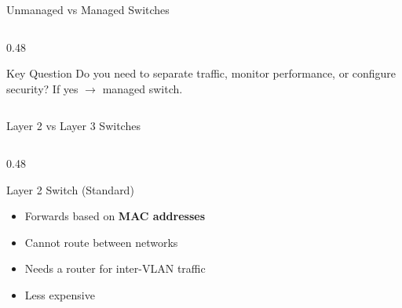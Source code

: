 \documentclass[aspectratio=169]{beamer}  %
\begin{document}
\begin{frame}{Unmanaged vs Managed Switches}
\begin{columns}[T]
\begin{column}{0.48\textwidth}
            \vspace{0.3em}
            \begin{exampleblock}{Key Question}
                Do you need to separate traffic, monitor performance, or configure security? If yes $\rightarrow$ managed switch.
            \end{exampleblock}
        \end{column}
    \end{columns}
\end{frame}

\begin{frame}{Layer 2 vs Layer 3 Switches}
    \begin{columns}[T]
        \begin{column}{0.48\textwidth}
            \begin{block}{Layer 2 Switch (Standard)}
                \begin{itemize}
                    \item Forwards based on \textbf{MAC addresses}
                    \item Cannot route between networks
                    \item Needs a router for inter-VLAN traffic
                    \item Less expensive
                \end{itemize}
                
                \centering



\end{block}
\end{column}
\end{columns}
\end{frame}
\end{document}
